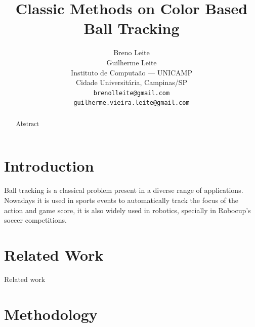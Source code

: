 \documentclass[10pt,twocolumn,letterpaper]{article}
\begin{document}
\title{Classic Methods on Color Based Ball Tracking}

\author{Breno Leite\\ Guilherme Leite\\
Instituto de Computa\cc\~ao --- UNICAMP\\
Cidade Universit\'aria, Campinas/SP\\
{\tt\small brenolleite@gmail.com\\ \tt\small guilherme.vieira.leite@gmail.com}
}

\maketitle

\begin{abstract}
  Abstract
\end{abstract}

\section{Introduction}

  Ball tracking is a classical problem present in a diverse range of
  applications. Nowadays it is used in sports events to automatically track the
  focus of the action and game score, it is also widely used in robotics,
  specially in Robocup’s soccer competitions.


\section{Related Work}

  Related work

\section{Methodology}
\end{document}
